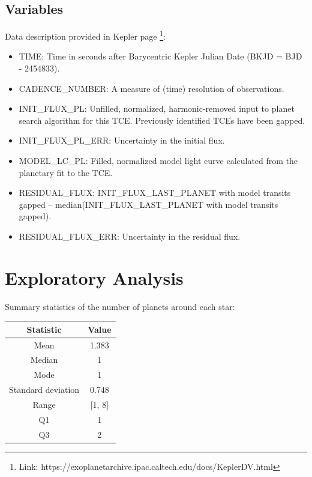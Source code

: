 \documentclass[%
aip,
amsmath,amssymb,
reprint,%
]{revtex4-1}
\begin{document}
\subsection{Variables}

Data description provided in Kepler page \footnote{Link: https://exoplanetarchive.ipac.caltech.edu/docs/KeplerDV.html}:

\begin{itemize}
  \item TIME: Time in seconds after Barycentric Kepler Julian Date (BKJD = BJD - 2454833).
  \item CADENCE\_NUMBER: A measure of (time) resolution of observations.
  \item INIT\_FLUX\_PL: Unfilled, normalized, harmonic-removed input to planet search algorithm for this TCE. Previously identified TCEs have been gapped.
  \item INIT\_FLUX\_PL\_ERR: Uncertainty in the initial flux.
  \item MODEL\_LC\_PL: Filled, normalized model light curve calculated from the planetary fit to the TCE.
  \item RESIDUAL\_FLUX: INIT\_FLUX\_LAST\_PLANET with model transits gapped – median(INIT\_FLUX\_LAST\_PLANET with model transits gapped).
  \item RESIDUAL\_FLUX\_ERR: Uncertainty in the residual flux.
\end{itemize}

\section{Exploratory Analysis}

Summary statistics of the number of planets around each star:

\begin{center}
 \begin{tabular}{| c | c |} 
 \hline
 \textbf{Statistic} & \textbf{Value}\\ [0.5 ex]
 \hline
 Mean & 1.383 \\ 
 \hline
 Median & 1 \\
 \hline
 Mode & 1 \\
 \hline
 Standard deviation & 0.748 \\
 \hline
 Range & [1, 8] \\
 \hline
 Q1 & 1 \\
 \hline
 Q3 & 2 \\ [1ex] 
 \hline
 \end{tabular}
\end{center}
\end{document}
